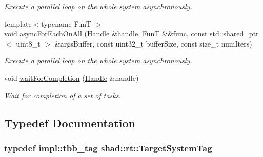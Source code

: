 \begin{DoxyCompactItemize}
\begin{DoxyCompactList}\small\item\em Execute a parallel loop on the whole system asynchronously. \end{DoxyCompactList}\item 
{\footnotesize template$<$typename Fun\-T $>$ }\\void \hyperlink{namespaceshad_1_1rt_a4737e1c84ac7e830a1a306ac5b136a7d}{async\-For\-Each\-On\-All} (\hyperlink{classshad_1_1rt_1_1Handle}{Handle} \&handle, Fun\-T \&\&func, const std\-::shared\-\_\-ptr$<$ uint8\-\_\-t $>$ \&args\-Buffer, const uint32\-\_\-t buffer\-Size, const size\-\_\-t num\-Iters)
\begin{DoxyCompactList}\small\item\em Execute a parallel loop on the whole system asynchronously. \end{DoxyCompactList}\item 
void \hyperlink{namespaceshad_1_1rt_a6ea1d3672bac3a80032863b6732a0c0a}{wait\-For\-Completion} (\hyperlink{classshad_1_1rt_1_1Handle}{Handle} \&handle)
\begin{DoxyCompactList}\small\item\em Wait for completion of a set of tasks. \end{DoxyCompactList}\end{DoxyCompactItemize}


\subsection{Typedef Documentation}
\hypertarget{namespaceshad_1_1rt_a1eb8df1be67eada9b4f647ff376695b0}{
\subsubsection[{Target\-System\-Tag}]{\setlength{\rightskip}{0pt plus 5cm}typedef impl\-::tbb\-\_\-tag {\bf shad\-::rt\-::\-Target\-System\-Tag}}}\label{namespaceshad_1_1rt_a1eb8df1be67eada9b4f647ff376695b0}


